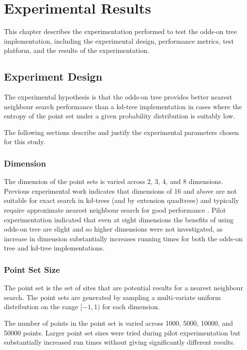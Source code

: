 \documentclass[mcs]{scsthesis}
\begin{document}
\chapter{Experimental Results}

This chapter describes the experimentation performed to test the odds-on tree
implementation, including the experimental design, performance metrics, test
platform, and the results of the experimentation.

\section{Experiment Design}

The experimental hypothesis is that the odds-on tree provides better nearest
neighbour search performance than a kd-tree implementation in cases where the
entropy of the point set under a given probability distribution is suitably low.

The following sections describe and justify the experimental parameters chosen
for this study.

\subsection{Dimension}

The dimension of the point sets is varied across 2, 3, 4, and 8 dimensions.
Previous experimental work indicates that dimensions of 16 and above are not
suitable for exact search in kd-trees (and by extension quadtrees) and typically 
require approximate nearest neighbour search for good performance \cite{app-ann}.
Pilot experimentation indicated that even at eight dimensions the benefits of
using odds-on tree are slight and so higher dimensions were not investigated, as
increase in dimension substantially increases running times for both the
odds-on tree and kd-tree implementations.

\subsection{Point Set Size}

The point set is the set of sites that are potential results for a nearest
neighbour search. The point sets are generated by sampling a multi-variate
uniform distribution on the range \([-1, 1)\) for each dimension.

The number of points in the point set is varied across 1000, 5000, 10000, and
50000 points. Larger point set sizes were tried during pilot experimentation but
substantially increased run times without giving significantly different
results.
\end{document}
